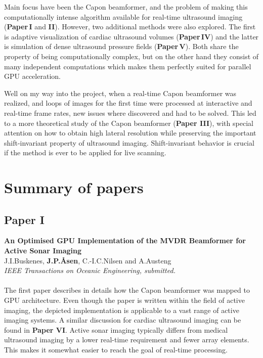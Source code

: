 Main focus have been the Capon beamformer, and the problem of making this computationally intense algorithm available for real-time ultrasound imaging (\textbf{Paper\,I} and \textbf{II}). However, two additional methods were also explored. The first is adaptive visualization of cardiac ultrasound volumes (\textbf{Paper\,IV}) and the latter is simulation of dense ultrasound pressure fields (\textbf{Paper\,V}). Both share the property of being computationally complex, but on the other hand they consist of many independent computations which makes them perfectly suited for parallel GPU acceleration.

Well on my way into the project, when a real-time Capon beamformer was realized, and loops of images for the first time were processed at interactive and real-time frame rates, new issues where discovered and had to be solved. This led to a more theoretical study of the Capon beamformer (\textbf{Paper III}), with special attention on how to obtain high lateral resolution while preserving the important shift-invariant property of ultrasound imaging. Shift-invariant behavior is crucial if the method is ever to be applied for live scanning. 



\section{Summary of papers}

\subsection{Paper I}
\textbf{An Optimised GPU Implementation of the MVDR Beamformer for Active Sonar Imaging}\\
J.\:I.\:Buskenes, \textbf{J.\:P.\:\AA{}sen}, C.-I.\:C.\:Nilsen and A.\:Austeng\\
{\it IEEE Transactions on Oceanic Engineering, submitted.}\\\\
The first paper describes in details how the Capon beamformer was mapped to GPU architecture. Even though the paper is written within the field of active  imaging, the depicted implementation is applicable to a vast range of active imaging systems. A similar discussion for cardiac ultrasound imaging can be found in \textbf{Paper VI}.  Active sonar imaging typically differs from medical ultrasound imaging by a lower real-time requirement and fewer array elements. This makes it somewhat easier to reach the goal of real-time processing. 


